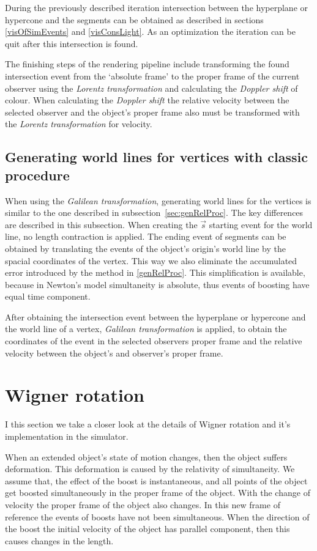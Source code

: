 \documentclass{egpubl}
\begin{document}
During the previously described iteration intersection between the hyperplane or hypercone and the segments can be obtained as described in sections \ref{visOfSimEvents} and \ref{visConsLight}. As an optimization the iteration can be quit after this intersection is found.

The finishing steps of the rendering pipeline include transforming the found intersection event from the `absolute frame' to the proper frame of the current observer using the \emph{Lorentz transformation} and calculating the \emph{Doppler shift} of colour. When calculating the \emph{Doppler shift} the relative velocity between the selected observer and the object's proper frame also must be transformed with the \emph{Lorentz transformation} for velocity.

\subsection{Generating world lines for vertices with classic procedure}
When using the \emph{Galilean transformation}, generating world lines for the vertices is similar to the one described in subsection~\ref{sec:genRelProc}. The key differences are described in this subsection. When creating the $\vec{s}$ starting event for the world line, no length contraction is applied. The ending event of segments can be obtained by translating the events of the object's origin's world line by the spacial coordinates of the vertex. This way we also eliminate the accumulated error introduced by the method in \ref{genRelProc}. This simplification is available, because in Newton's model simultaneity is absolute, thus events of boosting have equal time component.

After obtaining the intersection event between the hyperplane or hypercone and the world line of a vertex, \emph{Galilean transformation} is applied, to obtain the coordinates of the event in the selected observers proper frame and the relative velocity between the object's and observer's proper frame.

\section{Wigner rotation}
\label{sec:wigner_rotation}
I this section we take a closer look at the details of Wigner rotation and it's implementation in the simulator.

When an extended object's state of motion changes, then the object suffers deformation. This deformation is caused by the relativity of simultaneity. We assume that, the effect of the boost is instantaneous, and all points of the object get boosted simultaneously in the proper frame of the object. With the change of velocity the proper frame of the object also changes. In this new frame of reference the events of boosts have not been simultaneous. When the direction of the boost the initial velocity of the object has parallel component, then this causes changes in the length.
\end{document}
